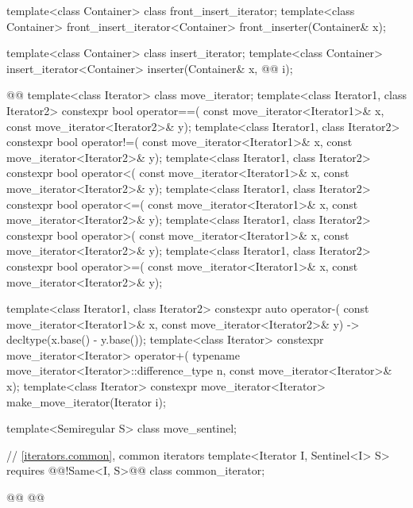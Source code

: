 \begin{codeblock}
  template<class Container> class front_insert_iterator;
  template<class Container>
    front_insert_iterator<Container> front_inserter(Container& x);

  template<class Container> class insert_iterator;
  template<class Container>
    insert_iterator<Container> inserter(Container& x, @@ i);

  @@
  template<class Iterator> class move_iterator;
  template<class Iterator1, class Iterator2>
    constexpr bool operator==(
      const move_iterator<Iterator1>& x, const move_iterator<Iterator2>& y);
  template<class Iterator1, class Iterator2>
    constexpr bool operator!=(
      const move_iterator<Iterator1>& x, const move_iterator<Iterator2>& y);
  template<class Iterator1, class Iterator2>
    constexpr bool operator<(
      const move_iterator<Iterator1>& x, const move_iterator<Iterator2>& y);
  template<class Iterator1, class Iterator2>
    constexpr bool operator<=(
      const move_iterator<Iterator1>& x, const move_iterator<Iterator2>& y);
  template<class Iterator1, class Iterator2>
    constexpr bool operator>(
      const move_iterator<Iterator1>& x, const move_iterator<Iterator2>& y);
  template<class Iterator1, class Iterator2>
    constexpr bool operator>=(
      const move_iterator<Iterator1>& x, const move_iterator<Iterator2>& y);

  template<class Iterator1, class Iterator2>
    constexpr auto operator-(
    const move_iterator<Iterator1>& x,
    const move_iterator<Iterator2>& y) -> decltype(x.base() - y.base());
  template<class Iterator>
    constexpr move_iterator<Iterator> operator+(
      typename move_iterator<Iterator>::difference_type n, const move_iterator<Iterator>& x);
  template<class Iterator>
    constexpr move_iterator<Iterator> make_move_iterator(Iterator i);

\end{codeblock}\begin{addedblock}\begin{codeblock}
  template<Semiregular S> class move_sentinel;

  // \ref{iterators.common}, common iterators
  template<Iterator I, Sentinel<I> S>
    requires @\newtxt{(}@!Same<I, S>@\newtxt{)}@
      class common_iterator;

  @@
    @@


\end{codeblock}
\end{addedblock}
